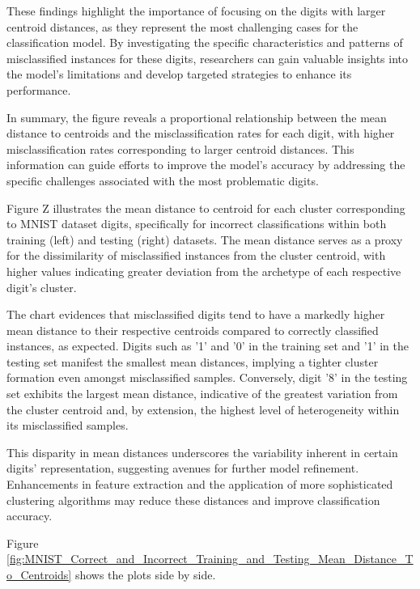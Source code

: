 These findings highlight the importance of focusing on the digits with larger centroid distances, as they represent the most challenging cases for the classification model. By investigating the specific characteristics and patterns of misclassified instances for these digits, researchers can gain valuable insights into the model's limitations and develop targeted strategies to enhance its performance.

In summary, the figure reveals a proportional relationship between the mean distance to centroids and the misclassification rates for each digit, with higher misclassification rates corresponding to larger centroid distances. This information can guide efforts to improve the model's accuracy by addressing the specific challenges associated with the most problematic digits.


Figure Z illustrates the mean distance to centroid for each cluster corresponding to MNIST dataset digits, specifically for incorrect classifications within both training (left) and testing (right) datasets. The mean distance serves as a proxy for the dissimilarity of misclassified instances from the cluster centroid, with higher values indicating greater deviation from the archetype of each respective digit's cluster.

The chart evidences that misclassified digits tend to have a markedly higher mean distance to their respective centroids compared to correctly classified instances, as expected. Digits such as '1' and '0' in the training set and '1' in the testing set manifest the smallest mean distances, implying a tighter cluster formation even amongst misclassified samples. Conversely, digit '8' in the testing set exhibits the largest mean distance, indicative of the greatest variation from the cluster centroid and, by extension, the highest level of heterogeneity within its misclassified samples. 

This disparity in mean distances underscores the variability inherent in certain digits' representation, suggesting avenues for further model refinement. Enhancements in feature extraction and the application of more sophisticated clustering algorithms may reduce these distances and improve classification accuracy.

Figure \ref{fig:MNIST_Correct_and_Incorrect_Training_and_Testing_Mean_Distance_To_Centroids} shows the plots side by side.

